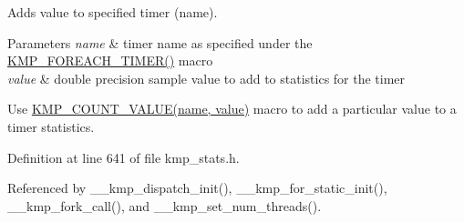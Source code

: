 Adds value to specified timer (name). 


\begin{DoxyParams}{Parameters}
{\em name} & timer name as specified under the \hyperlink{kmp__stats_8h_accf71030e44454acab22210bb4a89d1b}{K\-M\-P\-\_\-\-F\-O\-R\-E\-A\-C\-H\-\_\-\-T\-I\-M\-E\-R()} macro \\
\hline
{\em value} & double precision sample value to add to statistics for the timer\\
\hline
\end{DoxyParams}
Use \hyperlink{group__STATS__GATHERING_ga7691000a7864b475046ae62fcf0536ac}{K\-M\-P\-\_\-\-C\-O\-U\-N\-T\-\_\-\-V\-A\-L\-U\-E(name, value)} macro to add a particular value to a timer statistics. 

Definition at line 641 of file kmp\-\_\-stats.\-h.



Referenced by \-\_\-\-\_\-kmp\-\_\-dispatch\-\_\-init(), \-\_\-\-\_\-kmp\-\_\-for\-\_\-static\-\_\-init(), \-\_\-\-\_\-kmp\-\_\-fork\-\_\-call(), and \-\_\-\-\_\-kmp\-\_\-set\-\_\-num\-\_\-threads().

